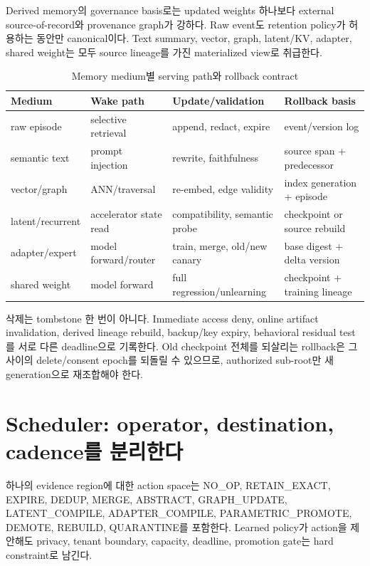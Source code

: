 Derived memory의 governance basis로는 updated weights 하나보다 external source-of-record와 provenance
graph가 강하다.\autocite{srcstc0053,srcstc0063,srcstc0066} Raw event도 retention
policy가 허용하는 동안만 canonical이다. Text summary, vector, graph, latent/KV, adapter, shared weight는
모두 source lineage를 가진 materialized view로 취급한다.

\begin{table}[htbp]
\centering
\caption{Memory medium별 serving path와 rollback contract}
\label{tab:medium-contract}
\begin{tabularx}{\textwidth}{L{0.18\textwidth} L{0.20\textwidth} Y L{0.24\textwidth}}
\toprule
Medium & Wake path & Update/validation & Rollback basis \\
\midrule
raw episode & selective retrieval & append, redact, expire & event/version log \\
semantic text & prompt injection & rewrite, faithfulness & source span + predecessor \\
vector/graph & ANN/traversal & re-embed, edge validity & index generation + episode \\
latent/recurrent & accelerator state read & compatibility, semantic probe & checkpoint or source rebuild \\
adapter/expert & model forward/router & train, merge, old/new canary & base digest + delta version \\
shared weight & model forward & full regression/unlearning & checkpoint + training lineage \\
\bottomrule
\end{tabularx}
\end{table}

삭제는 tombstone 한 번이 아니다. Immediate access deny, online artifact invalidation, derived lineage rebuild,
backup/key expiry, behavioral residual test를 서로 다른 deadline으로 기록한다. Old checkpoint 전체를 되살리는
rollback은 그 사이의 delete/consent epoch를 되돌릴 수 있으므로, authorized sub-root만 새 generation으로
재조합해야 한다.

\section{Scheduler: operator, destination, cadence를 분리한다}

하나의 evidence region에 대한 action space는 NO\_OP, RETAIN\_EXACT, EXPIRE, DEDUP, MERGE,
ABSTRACT, GRAPH\_UPDATE, LATENT\_COMPILE, ADAPTER\_COMPILE, PARAMETRIC\_PROMOTE, DEMOTE,
REBUILD, QUARANTINE를 포함한다. Learned policy가 action을 제안해도 privacy, tenant boundary,
capacity, deadline, promotion gate는 hard constraint로 남긴다.

